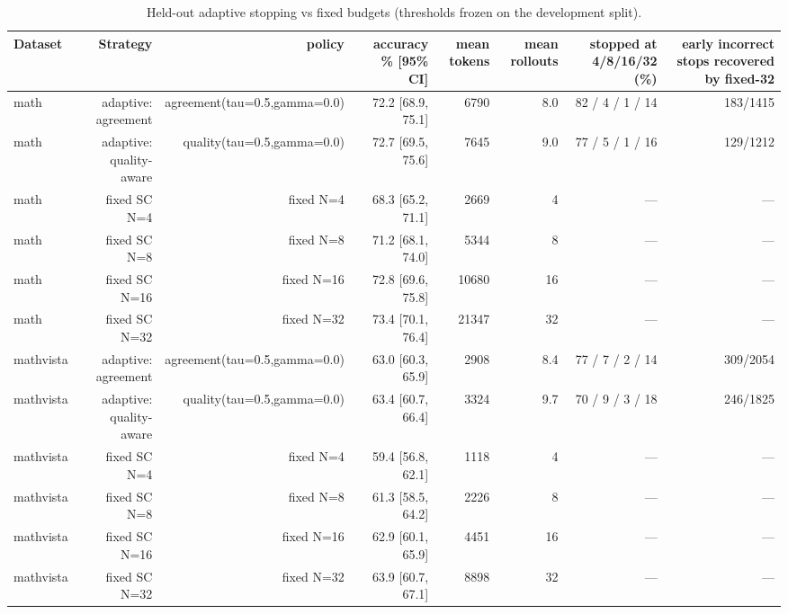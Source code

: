 \begin{table}[t]
\centering\small
\begin{tabular}{lrrrrrrr}
\toprule
Dataset & Strategy & policy & accuracy \% [95\% CI] & mean tokens & mean rollouts & stopped at 4/8/16/32 (\%) & early incorrect stops recovered by fixed-32 \\
\midrule
math & adaptive: agreement & agreement(tau=0.5,gamma=0.0) & 72.2 [68.9, 75.1] & 6790 & 8.0 & 82 / 4 / 1 / 14 & 183/1415 \\
math & adaptive: quality-aware & quality(tau=0.5,gamma=0.0) & 72.7 [69.5, 75.6] & 7645 & 9.0 & 77 / 5 / 1 / 16 & 129/1212 \\
math & fixed SC N=4 & fixed N=4 & 68.3 [65.2, 71.1] & 2669 & 4 & — & — \\
math & fixed SC N=8 & fixed N=8 & 71.2 [68.1, 74.0] & 5344 & 8 & — & — \\
math & fixed SC N=16 & fixed N=16 & 72.8 [69.6, 75.8] & 10680 & 16 & — & — \\
math & fixed SC N=32 & fixed N=32 & 73.4 [70.1, 76.4] & 21347 & 32 & — & — \\
mathvista & adaptive: agreement & agreement(tau=0.5,gamma=0.0) & 63.0 [60.3, 65.9] & 2908 & 8.4 & 77 / 7 / 2 / 14 & 309/2054 \\
mathvista & adaptive: quality-aware & quality(tau=0.5,gamma=0.0) & 63.4 [60.7, 66.4] & 3324 & 9.7 & 70 / 9 / 3 / 18 & 246/1825 \\
mathvista & fixed SC N=4 & fixed N=4 & 59.4 [56.8, 62.1] & 1118 & 4 & — & — \\
mathvista & fixed SC N=8 & fixed N=8 & 61.3 [58.5, 64.2] & 2226 & 8 & — & — \\
mathvista & fixed SC N=16 & fixed N=16 & 62.9 [60.1, 65.9] & 4451 & 16 & — & — \\
mathvista & fixed SC N=32 & fixed N=32 & 63.9 [60.7, 67.1] & 8898 & 32 & — & — \\
\bottomrule
\end{tabular}
\caption{Held-out adaptive stopping vs fixed budgets (thresholds frozen on the development split).}
\label{tab:task3_adaptive}
\end{table}
